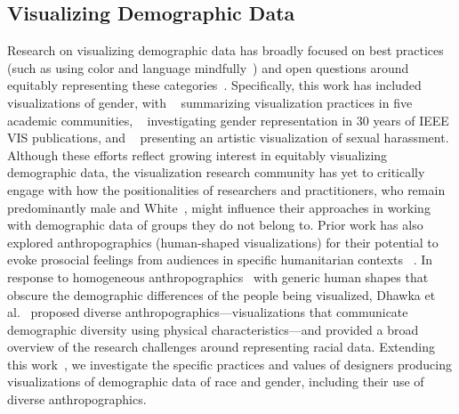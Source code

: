 \subsection{Visualizing Demographic Data}
Research on visualizing demographic data has broadly focused on best practices (such as using color and language mindfully~\cite{SchwabishFeng, Datawrapper-Race}) and open questions around equitably representing these categories~\cite{cabric2023open, dhawka2022representing}. Specifically, this work has included visualizations of gender, with ~\citet{Cabric2024} summarizing visualization practices in five academic communities, ~\citet{tovanich2022} investigating gender representation in 30 years of IEEE VIS publications, and ~\citet{elli2022visualizing} presenting an artistic visualization of sexual harassment. Although these efforts reflect growing interest in equitably visualizing demographic data, the visualization research community has yet to critically engage with how the positionalities of researchers and practitioners, who remain predominantly male and White~\cite{WEIRDCHI, oconnor2023decolonizing}, might influence their approaches in working with demographic data of groups they do not belong to. Prior work has also explored anthropographics (human-shaped visualizations) for their potential to evoke prosocial feelings from audiences in specific humanitarian contexts ~\cite{Boy, Morais2020, Morais2021}. In response to homogeneous anthropographics~\cite{Boy, Morais2020, Morais2021} with generic human shapes that obscure the demographic differences of the people being visualized, Dhawka et al.~\cite{dhawka2023we, dhawka2024} proposed diverse anthropographics---visualizations that communicate demographic diversity using physical characteristics---and provided a broad overview of the research challenges around representing racial data. Extending this work~\cite{dhawka2023we, dhawka2024}, we investigate the specific practices and values of designers producing visualizations of demographic data of race and gender, including their use of diverse anthropographics. 

